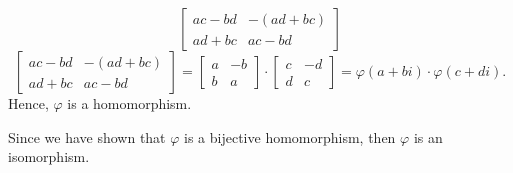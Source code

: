 \begin{enumerate}[label=\textbf{\arabic*.}]
{\begin{itemize}
\[\begin{bmatrix}
                    ac - bd & -(ad + bc) \\
                    ad + bc & ac - bd
                \end{bmatrix}
            \]
            \[
                \begin{bmatrix}
                    ac - bd & -(ad + bc) \\
                    ad + bc & ac - bd
                \end{bmatrix} = \begin{bmatrix}
                    a & -b \\
                    b & a
                \end{bmatrix} \cdot \begin{bmatrix}
                    c & -d \\
                    d & c
                \end{bmatrix} = \varphi(a + bi) \cdot \varphi(c + di).
            \]
            Hence, \(\varphi\) is a homomorphism.
        \end{itemize}
        Since we have shown that \(\varphi\) is a bijective homomorphism, then \(\varphi\) is an isomorphism.
    }
\end{enumerate}